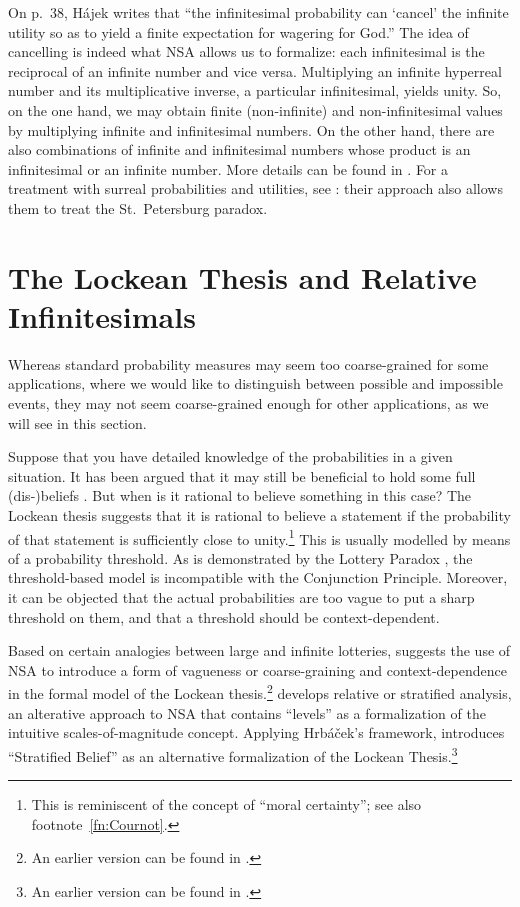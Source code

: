 On p.~38, H\'{a}jek writes that ``the infinitesimal probability can `cancel' the infinite utility so as to yield a finite expectation for wagering for God.''
The idea of cancelling is indeed what NSA allows us to formalize: each infinitesimal is the reciprocal of an infinite number and vice versa. Multiplying an infinite hyperreal number and its multiplicative inverse, a particular infinitesimal, yields unity. So, on the one hand, we may obtain finite (non-infinite) and non-infinitesimal values by multiplying infinite and infinitesimal numbers. On the other hand, there are also combinations of infinite and infinitesimal numbers whose product is an infinitesimal or an infinite number. More details can be found in \citet{Wenmackers:forthc}. For a treatment with surreal probabilities and utilities, see \citet{ChenRubio:forthc}: their approach also allows them to treat the St.~Petersburg paradox.

\section{The Lockean Thesis and Relative Infinitesimals}\label{sec:LT}
Whereas standard probability measures may seem too coarse-grained for some applications, where we would like to distinguish between possible and impossible events, they may not seem coarse-grained enough for other applications, as we will see in this section.

Suppose that you have detailed knowledge of the probabilities in a given situation. It has been argued that it may still be beneficial to hold some full (dis-)beliefs \citep{Foley:2009}. But when is it rational to believe something in this case? The Lockean thesis suggests that it is rational to believe a statement if the probability of that statement is sufficiently close to unity.\footnote{This is reminiscent of the concept of ``moral certainty''; see also footnote~\ref{fn:Cournot}.} This is usually modelled by means of a probability threshold. As is demonstrated by the Lottery Paradox \citep{Kyburg:1961}, the threshold-based model is incompatible with the Conjunction Principle. Moreover, it can be objected that the actual probabilities are too vague to put a sharp threshold on them, and that a threshold should be context-dependent.

Based on certain analogies between large and infinite lotteries, \citet{Wenmackers:2012f} suggests the use of NSA to introduce a form of vagueness or coarse-graining and context-dependence in the formal model of the Lockean thesis.\footnote{An earlier version can be found in \citet[Ch.~4]{Wenmackers:2011a}.} \citet{Hrbacek:2007} develops relative or stratified analysis, an alterative approach to NSA that contains ``levels'' as a formalization of the intuitive scales-of-magnitude concept. Applying Hrb\'{a}\v{c}ek's framework, \citet{Wenmackers:2013} introduces ``Stratified Belief'' as an alternative formalization of the Lockean Thesis.\footnote{An earlier version can be found in \citet[Ch.~3]{Wenmackers:2011a}.}

